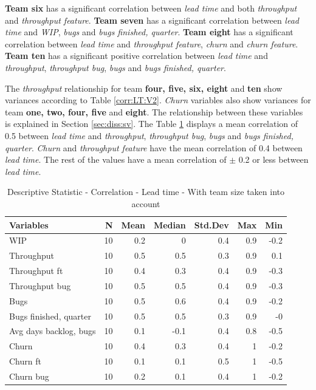 \documentclass[UKenglish]{ifimaster}  %
\begin{document}
\textbf{Team six} has a significant correlation between \textit{lead time} and both \textit{throughput} and \textit{throughput feature}. \textbf{Team seven} has a significant correlation between \textit{lead time} and \textit{WIP}, \textit{bugs} and \textit{bugs finished, quarter}. \textbf{Team eight} has a significant correlation between \textit{lead time} and \textit{throughput feature}, \textit{churn} and \textit{churn feature}. \textbf{Team ten} has a significant positive correlation between \textit{lead time} and \textit{throughput}, \textit{throughput bug}, \textit{bugs} and \textit{bugs finished, quarter}.

The \textit{throughput} relationship for team \textbf{four, five, six, eight} and \textbf{ten} show variances according to Table \ref{corr:LT:V2}. \textit{Churn} variables also show variances for team \textbf{one, two, four, five} and \textbf{eight}. The relationship between these variables is  explained in Section \ref{sec:diss:sv}.
The Table \ref{DS:corr:LT:v2} displays a mean correlation of 0.5 between \textit{lead time} and  \textit{throughput}, \textit{throughput bug}, \textit{bugs} and \textit{bugs finished, quarter}. \textit{Churn} and \textit{throughput feature} have the mean correlation of 0.4 between \textit{lead time}. The rest of the values have a mean correlation of $\pm$ 0.2 or less between \textit{lead time}.



\begin{table}[H]
 \centering
 \begin{tabular}{ | l | r | r | r | r | r | r | }
 \hline
\textbf{Variables}& \bf{N} & \bf{Mean} & \bf{Median} & \bf{Std.Dev} & \bf{Max} & \bf{Min} \\ \hline
WIP  & 10 & 0.2 & 0 & 0.4 & 0.9 & -0.2\\ \hline
Throughput  & 10 & 0.5 & 0.5 & 0.3 & 0.9 & 0.1\\ \hline
Throughput ft  & 10 & 0.4 & 0.3 & 0.4 & 0.9 & -0.3\\ \hline
Throughput bug  & 10 & 0.5 & 0.5 & 0.4 & 0.9 & -0.3\\ \hline
Bugs  & 10 & 0.5 & 0.6 & 0.4 & 0.9 & -0.2\\ \hline
Bugs finished, quarter  & 10 & 0.5 & 0.5 & 0.3 & 0.9 & -0\\ \hline
Avg days backlog, bugs  & 10 & 0.1 & -0.1 & 0.4 & 0.8 & -0.5\\ \hline
Churn  & 10 & 0.4 & 0.3 & 0.4 & 1 & -0.2\\ \hline
Churn ft  & 10 & 0.1 & 0.1 & 0.5 & 1 & -0.5\\ \hline
Churn bug  & 10 & 0.2 & 0.1 & 0.4 & 1 & -0.2 \\ \hline
\end{tabular}
 \caption{Descriptive Statistic - Correlation - Lead time - With team size taken into account}
 \label{DS:corr:LT:v2}
 \end{table}
\end{document}

